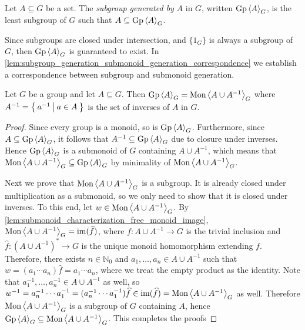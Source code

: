 \begin{definition}%
  \label{def:generated_subgroup}
  \rocqok{}
Let $A\subseteq G$ be a set.
The \emph{subgroup generated by} $A$ in $G$, written $\textrm{Gp}\left\langle A \right\rangle_G$, is the least subgroup of
$G$ such that $A\subseteq \textrm{Gp}\left\langle A \right\rangle_G$.
\end{definition}
Since subgroups are closed under intersection, and
$\{1_G\}$ is always a subgroup of $G$, then $\textrm{Gp}\left\langle A \right\rangle_G$ is guaranteed to exist. In
\cref{lem:subgroup_generation_submonoid_generation_correspondence} we establish a correspondence
between subgroup and submonoid generation.

\begin{lemma}\label{lem:subgroup_generation_submonoid_generation_correspondence}
  \rocqok{}
  Let $G$ be a group and let $A\subseteq G$. Then
  $\textrm{Gp}\left\langle A \right\rangle_G = \textrm{Mon}\left\langle A\cup A^{-1} \right\rangle_G$ where $A^{-1} = \left\{\: a^{-1} \: \middle|\: a\in A \:\right\}$ is the
  set of inverses of $A$ in $G$.
\end{lemma}
\begin{proof}
  \rocqok{}
  Since every group is a monoid, so is $\textrm{Gp}\left\langle A \right\rangle_G$. Furthermore, since
  $A\subseteq \textrm{Gp}\left\langle A \right\rangle_G$, it follows that $A^{-1} \subseteq \textrm{Gp}\left\langle A \right\rangle_G$ due to closure
  under inverses. Hence $\textrm{Gp}\left\langle A \right\rangle_G$ is a submonoid of $G$ containing $A\cup A^{-1}$, which
  means that $\textrm{Mon}\left\langle A\cup A^{-1} \right\rangle_G\subseteq \textrm{Gp}\left\langle A \right\rangle_G$ by minimality of $\textrm{Mon}\left\langle A\cup A^{-1} \right\rangle_G$.

  Next we prove that $\textrm{Mon}\left\langle A\cup A^{-1} \right\rangle_G$ is a subgroup. It is already closed under
  multiplication as a submonoid, so we only need to show that it is closed under inverses. To
  this end, let $w\in \textrm{Mon}\left\langle A \cup A^{-1} \right\rangle_G$. By \cref{lem:submonoid_characterization_free_monoid_image},
  $\textrm{Mon}\left\langle A \cup A^{-1} \right\rangle_G = \textrm{im}(\widehat{f})$, where $f: A\cup A^{-1} \rightarrow G$ is the
  trivial inclusion and $\widehat{f}: {(A\cup A^{-1})}^\ast \rightarrow G$ is the unique monoid
  homomorphism extending $f$. Therefore, there exists $n\in \mathbb{N}_0$ and $a_1, \ldots, a_n
  \in A\cup A^{-1}$ such that
  $w = (a_1\cdots a_n)\widehat{f} = a_1\cdots a_n$, where we treat the empty product as the
  identity. Note that $a_1^{-1},\ldots, a_n^{-1}\in A\cup A^{-1}$ as well, so
  $w^{-1} = a_n^{-1}\cdots a_1^{-1} = (a_n^{-1}\cdots a_1^{-1})\widehat{f}\in \textrm{im}(\widehat{f}) =
  \textrm{Mon}\left\langle A\cup A^{-1} \right\rangle_G$ as well. Therefore
  $\textrm{Mon}\left\langle A\cup A^{-1} \right\rangle_G$ is a subgroup of $G$ containing $A$, hence
  $\textrm{Gp}\left\langle A \right\rangle_G \subseteq \textrm{Mon}\left\langle A\cup A^{-1} \right\rangle_G$. This completes the proofs
\end{proof}

